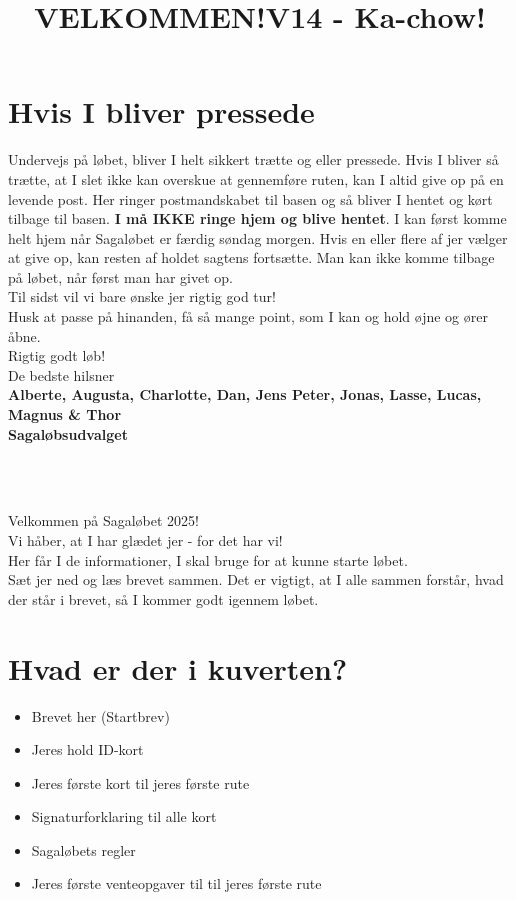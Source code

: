 \section{Hvis I bliver pressede}
Undervejs på løbet, bliver I helt sikkert trætte og eller pressede. Hvis I bliver så trætte, at I slet ikke kan overskue at gennemføre ruten, kan I altid give op på en levende post. Her ringer postmandskabet til basen og så bliver I hentet og kørt tilbage til basen. \textbf{I må IKKE ringe hjem og blive hentet}. I kan først komme helt hjem når Sagaløbet er færdig søndag morgen. Hvis en eller flere af jer vælger at give op, kan resten af holdet sagtens fortsætte. Man kan ikke komme tilbage på løbet, når først man har givet op.\\
\newline
Til sidst vil vi bare ønske jer rigtig god tur!\\
Husk at passe på hinanden, få så mange point, som I kan og hold øjne og ører åbne.\\
\newline
Rigtig godt løb!\\
\newline
\textcolor{søblå}{De bedste hilsner}\\
\textcolor{natblå}{\textbf{Alberte, Augusta, Charlotte, Dan, Jens Peter, Jonas, Lasse, Lucas, Magnus \& Thor}}\\
\textcolor{natblå}{\textbf{Sagaløbsudvalget}}\\
\newpage
\title{VELKOMMEN!}\\
\newline
\title{\textcolor{søblå}{V14 - Ka-chow! }}\\
\newline
Velkommen på Sagaløbet 2025!\\
Vi håber, at I har glædet jer - for det har vi!\\
Her får I de informationer, I skal bruge for at kunne starte løbet.\\
Sæt jer ned og læs brevet sammen. Det er vigtigt, at I alle sammen forstår, hvad der står i brevet, så I kommer godt igennem løbet.
\section{Hvad er der i kuverten?}
\begin{itemize}
    \item Brevet her (Startbrev)
    \item Jeres hold ID-kort
    \item Jeres første kort til jeres første rute
    \item Signaturforklaring til alle kort
    \item Sagaløbets regler
    \item Jeres første venteopgaver til til jeres første rute
\end{itemize}
